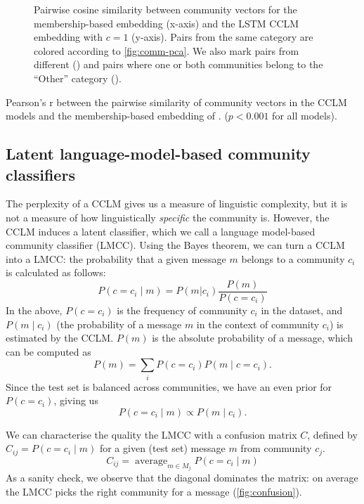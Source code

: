 \documentclass[11pt,a4paper]{article}
\DeclareMathOperator*{\avg}{average}
\begin{document}
\begin{figure}
  \caption{Pairwise cosine similarity between community vectors for 
    the membership-based embedding (x-axis) and
  the LSTM CCLM embedding with $c=1$ (y-axis). 
  Pairs from the same category are colored according to \cref{fig:comm-pca}.
  We also mark pairs from different (\texttimes) and pairs where one or both
  communities belong to the ``Other'' category (\textbigcircle).
  }
  \label{fig:pairwise-comm-sim}
\end{figure}

\begin{table}
  \centering
  
  \caption{Pearson's r between the pairwise similarity of community vectors
  in the CCLM models and the membership-based embedding of \citet{Kumar2018}.
  ($p<0.001$ for all models).
  }
  \label{tab:pairwise-comm-sim}
\end{table}

\subsection{Latent language-model-based community classifiers}

The perplexity of a CCLM gives us a measure of linguistic complexity,
but it is not a measure of how linguistically \emph{specific} the
community is. However, the CCLM induces a latent classifier,
which we call a language model-based community classifier
(LMCC). Using the Bayes theorem, we can turn a
CCLM into a LMCC: the probability that a given message $m$
belongs to a community $c_i$ is calculated as follows:
\[P(c=c_i \mid m) = P(m | c_i)\frac {P(m)} {P(c=c_i)}\]
In the above,
$P(c=c_i)$ is the frequency of community $c_i$ in the dataset, and
$P(m \mid c_i)$ (the probability of a message $m$
in the context of community $c_i$) is estimated by the CCLM. 
$P(m)$ is the absolute
probability of a message, which can be computed as
\[P(m) = \sum_i P(c=c_i) P(m\mid c=c_i ). \]
Since the test set is balanced across communities,
we have an even prior for $P(c=c_i)$, giving us
\[P(c=c_i\mid m) \propto  P(m\mid c_i).\]

We can characterise the quality the LMCC with a confusion matrix
$C$, defined by $C_{ij} = P(c=c_i \mid m)$ for a given (test set) message $m$ 
from community $c_j$.
\[C_{ij} = \avg_{m\in M_j}P(c=c_i \mid m)\]
As a sanity check, we observe that the diagonal dominates the matrix: on average the LMCC picks the right community for a message (\cref{fig:confusion}).
\end{document}
